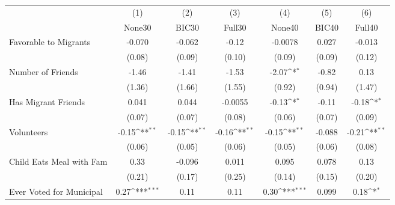 {
\def\sym#1{\ifmmode^{#1}\else\(^{#1}\)\fi}
\begin{tabular}{l*{6}{c}}
\toprule
            &\multicolumn{1}{c}{(1)}&\multicolumn{1}{c}{(2)}&\multicolumn{1}{c}{(3)}&\multicolumn{1}{c}{(4)}&\multicolumn{1}{c}{(5)}&\multicolumn{1}{c}{(6)}\\
            &\multicolumn{1}{c}{None30}&\multicolumn{1}{c}{BIC30}&\multicolumn{1}{c}{Full30}&\multicolumn{1}{c}{None40}&\multicolumn{1}{c}{BIC40}&\multicolumn{1}{c}{Full40}\\
\midrule
Favorable to Migrants&      -0.070         &      -0.062         &       -0.12         &     -0.0078         &       0.027         &      -0.013         \\
            &      (0.08)         &      (0.09)         &      (0.10)         &      (0.09)         &      (0.09)         &      (0.12)         \\
\addlinespace
Number of Friends&       -1.46         &       -1.41         &       -1.53         &       -2.07\sym{*}  &       -0.82         &        0.13         \\
            &      (1.36)         &      (1.66)         &      (1.55)         &      (0.92)         &      (0.94)         &      (1.47)         \\
\addlinespace
Has Migrant Friends&       0.041         &       0.044         &     -0.0055         &       -0.13\sym{*}  &       -0.11         &       -0.18\sym{*}  \\
            &      (0.07)         &      (0.07)         &      (0.08)         &      (0.06)         &      (0.07)         &      (0.09)         \\
\addlinespace
Volunteers  &       -0.15\sym{**} &       -0.15\sym{**} &       -0.16\sym{**} &       -0.15\sym{**} &      -0.088         &       -0.21\sym{**} \\
            &      (0.06)         &      (0.05)         &      (0.06)         &      (0.05)         &      (0.06)         &      (0.08)         \\
\addlinespace
Child Eats Meal with Fam&        0.33         &      -0.096         &       0.011         &       0.095         &       0.078         &        0.13         \\
            &      (0.21)         &      (0.17)         &      (0.25)         &      (0.14)         &      (0.15)         &      (0.20)         \\
\addlinespace
Ever Voted for Municipal&        0.27\sym{***}&        0.11         &        0.11         &        0.30\sym{***}&       0.099         &        0.18\sym{*}  \\

\end{tabular}}

